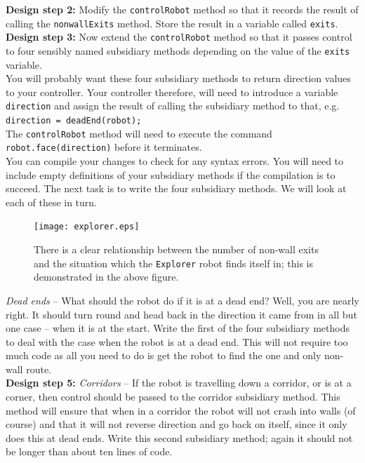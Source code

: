 \noindent
{\bf Design step 2:} Modify the {\tt controlRobot} method so that
it records the result of calling the {\tt nonwallExits} method. Store
the result in a variable called {\tt exits}. \\

\noindent 
{\bf Design step 3:} Now extend the  {\tt controlRobot}
method so that it passes control to four sensibly named subsidiary
methods depending on the value of the {\tt exits} variable.\\

\noindent
You will probably want these four subsidiary methods to return
direction values to your controller. Your controller therefore,
will need to introduce a variable {\tt direction} and assign the
result of calling the subsidiary method to that, e.g. \\

{\tt direction = deadEnd(robot);}\\

\noindent
The {\tt controlRobot} method will need to
execute the command {\tt robot.face(direction)} before it terminates. \\

\noindent
You can compile your changes to check for any syntax errors. You
will need to include empty definitions of your subsidiary methods
if the compilation is to succeed. The next task is to write the
four subsidiary methods. We will look at each of these in turn. \\

\begin{figure}[t]
\centering
\texttt{[image: explorer.eps]}
\caption{There is a clear relationship between the number of
non-wall exits and the situation which the {\tt Explorer} robot
finds itself in; this is demonstrated in the above figure.
\label{explorer}}
\end{figure}

 {\it Dead ends} -- What
should the robot do if it is at a dead end? Well, you are nearly
right. It should turn round and head back in the direction it
came from in all but one case -- when it is at the start. Write
the first of the four subsidiary methods to deal with the case
when the robot is at a dead end. This will not require too much
code as all you need to do is get the robot to find the one and
only non-wall route.\\

\noindent
{\bf Design step 5:} {\it Corridors} -- If the robot is travelling down a
corridor, or is at a corner, then control should be
passed to the corridor subsidiary method. This method will ensure that
when in a corridor the robot will not crash into walls (of course) and
that it will not reverse direction and go back on itself, since it only
does this at dead ends. Write this second subsidiary method; again it
should not be longer than about ten lines of code. \\

